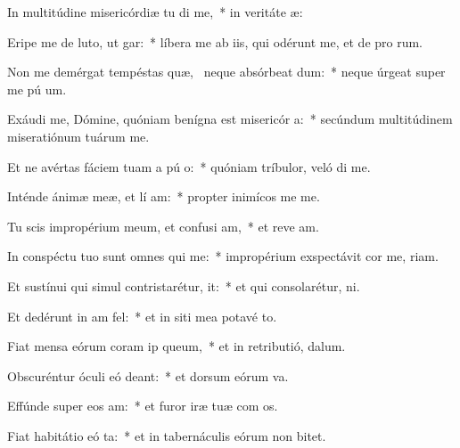 \item In multitúdine misericórdiæ tu di me,~* in veritáte  æ:
\item Eripe me de luto, ut  gar:~* líbera me ab iis, qui odérunt me, et de pro rum.
\item Non me demérgat tempéstas quæ,~\pscross{} neque absórbeat  dum:~* neque úrgeat super me pú  um.
\item Exáudi me, Dómine, quóniam benígna est misericór a:~* secúndum multitúdinem miseratiónum tuárum   me.
\item Et ne avértas fáciem tuam a pú o:~* quóniam tríbulor, veló di me.
\item Inténde ánimæ meæ, et lí am:~* propter inimícos me  me.
\item Tu scis impropérium meum, et confusi am,~* et reve am.
\item In conspéctu tuo sunt omnes qui  me:~* impropérium exspectávit cor me,  riam.
\item Et sustínui qui simul contristarétur,   it:~* et qui consolarétur,   ni.
\item Et dedérunt in  am fel:~* et in siti mea potavé  to.
\item Fiat mensa eórum coram ip  queum,~* et in retributió,   dalum.
\item Obscuréntur óculi eó  deant:~* et dorsum eórum  va.
\item Effúnde super eos  am:~* et furor iræ tuæ com os.
\item Fiat habitátio eó ta:~* et in tabernáculis eórum non   bitet.
